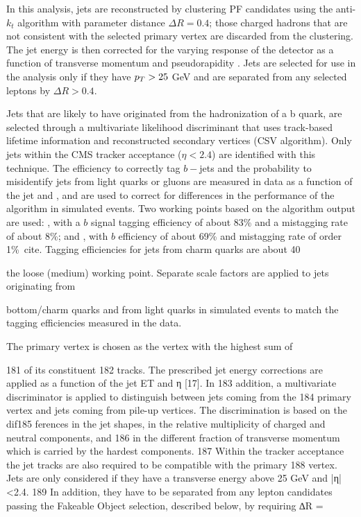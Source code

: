 In this analysis, jets are reconstructed by clustering PF candidates using the anti-$k_t$ algorithm with parameter distance $\Delta R=0.4$; those charged hadrons that are not consistent with the selected primary vertex are discarded from the clustering. The jet energy is then corrected for the varying response of the detector as a function of transverse momentum \pt and pseudorapidity \etac. Jets are selected for use in the analysis only if they have $p_T > 25$ GeV and are separated from any selected leptons by $\Delta R > 0.4$.

Jets that are likely to have originated from the hadronization of a b quark, are selected through a multivariate likelihood discriminant that uses track-based lifetime information and reconstructed secondary vertices (CSV algorithm). Only jets within the CMS tracker acceptance ($\eta < 2.4$) are identified with this technique. The efficiency to correctly tag $b-$jets and the probability to misidentify jets from light quarks or gluons are measured in data as a function of the jet \pt and \etac, and are used to correct for differences in the performance of the algorithm in simulated events. Two working points based on the algorithm output are used: , with a $b$ signal tagging efficiency of about 83\% and a mistagging rate of about 8\%; and , with $b$ efficiency of about 69\% and mistagging rate of order 1\%\ cite{}. Tagging efficiencies for jets from charm quarks are about 40%

the loose (medium) working point. Separate scale factors are applied to jets originating from

bottom/charm quarks and from light quarks in simulated events to match the tagging efficiencies measured in the data.









The primary vertex is chosen as the vertex with the highest sum of \pt
















181 of its constituent
182 tracks. The prescribed jet energy corrections are applied as a function of the jet ET and η [17]. In
183 addition, a multivariate discriminator is applied to distinguish between jets coming from the
184 primary vertex and jets coming from pile-up vertices. The discrimination is based on the dif185
ferences in the jet shapes, in the relative multiplicity of charged and neutral components, and
186 in the different fraction of transverse momentum which is carried by the hardest components.
187 Within the tracker acceptance the jet tracks are also required to be compatible with the primary
188 vertex. Jets are only considered if they have a transverse energy above 25 GeV and |η| <2.4.
189 In addition, they have to be separated from any lepton candidates passing the Fakeable Object
selection, described below, by requiring ∆R =

